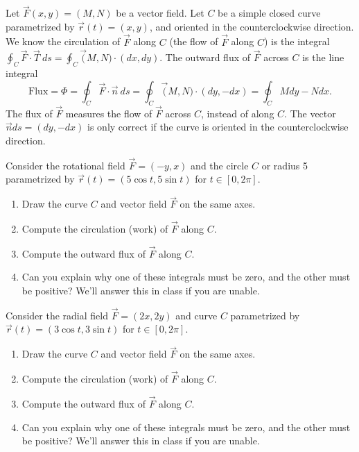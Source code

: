 \begin{definition}[Flux]
%
 Let $\vec F(x,y)=(M,N)$ be a vector field.  Let $C$ be a simple closed curve parametrized by $\vec r(t)=(x,y)$, and oriented in the counterclockwise direction. 
 We know the circulation of $\vec F$ along $C$ (the flow of $\vec F$ along $C$) is the integral $\oint_C \vec F\cdot \vec T\ ds = \oint_C\vec (M,N)\cdot(dx,dy)$. The outward flux of $\vec F$ across $C$ is the line integral
$$\text{Flux}=\Phi = \oint_C \vec F\cdot \vec n\ ds = \oint_C\vec (M,N)\cdot(dy,-dx) = \oint_C Mdy-Ndx.$$
The flux of $\vec F$ measures the flow of $\vec F$ across $C$, instead of along $C$.
The vector $\vec n ds = (dy,-dx)$ is only correct if the curve is oriented in the counterclockwise direction.
\end{definition}



\begin{problem}
%
 Consider the rotational field $\vec F=(-y,x)$ and the circle $C$ or radius 5 parametrized by $\vec r(t)=(5\cos t, 5\sin t)$ for $t\in[0,2\pi]$.  
\begin{enumerate}
 \item Draw the curve $C$ and vector field $\vec F$ on the same axes.
 \item Compute the circulation (work) of $\vec F$ along $C$.
 \item Compute the outward flux of $\vec F$ along $C$.
 \item Can you explain why one of these integrals must be zero, and the other must be positive? We'll answer this in class if you are unable.
\end{enumerate}

\end{problem}

\begin{problem}
 Consider the radial field $\vec F=(2x,2y)$ and curve $C$ parametrized by $\vec r(t)=(3\cos t, 3\sin t)$ for $t\in[0,2\pi]$.  
\begin{enumerate}
 \item Draw the curve $C$ and vector field $\vec F$ on the same axes.
 \item Compute the circulation (work) of $\vec F$ along $C$.
 \item Compute the outward flux of $\vec F$ along $C$.
 \item Can you explain why one of these integrals must be zero, and the other must be positive? We'll answer this in class if you are unable.
\end{enumerate}

\end{problem}

